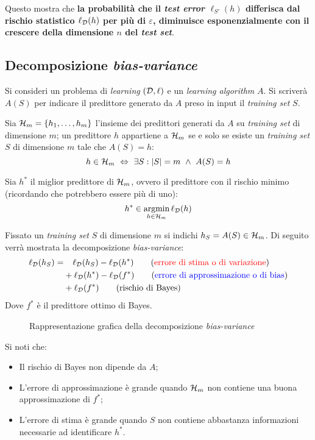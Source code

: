 Questo mostra che \textbf{la probabilità che il \textit{test error} 
$\ell_{S'}(h)$ differisca dal rischio statistico $\ell_{\mathcal{D}}(h)$ per più di 
$\varepsilon$, diminuisce esponenzialmente con il crescere della dimensione $n$ 
del \textit{test set}}.

\subsection{Decomposizione \textit{bias-variance}}
Si consideri un problema di \textit{learning} $(\mathcal{D},\ell)$ e un \textit{learning
algorithm} $A$. Si scriverà $A(S)$ per indicare il predittore generato da $A$
preso in input il \textit{training set} $S$.

Sia $\mathcal{H}_m = \{h_1,\dots,h_m\}$ l'insieme dei predittori generati da $A$ su 
\textit{training set} di dimensione $m$; un predittore $h$ appartiene a $\mathcal{H}_m$ se
e solo se esiste un \textit{training set} $S$ di dimensione $m$ tale che $A(S)=h$:
$$ h\in\mathcal{H}_m \ \Leftrightarrow \ \exists S : |S|=m \ \wedge \ A(S)=h $$

Sia $h^*$ il miglior predittore di $\mathcal{H}_m$, ovvero il predittore con il rischio minimo
(ricordando che potrebbero essere più di uno):
$$ h^* \in \operatorname*{argmin}_{h\in\mathcal{H}_m} \ell_{\mathcal{D}}(h) $$

Fissato un \textit{training set} $S$ di dimensione $m$ si indichi
$ h_S = A(S) \in \mathcal{H}_m $. Di seguito verrà mostrata la decomposizione
\textit{bias-variance}:
\begin{align}
    \ell_\D(h_S) =& \phantom{+.} \ell_\D(h_S) - \ell_\D(h^*)
    \tag{{\color{red}errore di stima o di variazione}}\\ 
        & +\ell_\D(h^*) - \ell_\D(f^*)
            \tag{{\color{blue}errore di approssimazione o di bias}}\\
        & +\ell_\D(f^*) \tag{rischio di Bayes}
\end{align}
Dove $f^*$ è il predittore ottimo di Bayes.
\begin{figure}[h]
    \centering
    
    \caption{Rappresentazione grafica della decomposizione \textit{bias-variance}}
\end{figure}

Si noti che:
\begin{itemize}
    \item Il rischio di Bayes non dipende da $A$;
    \item L'errore di approssimazione è grande quando $\mathcal{H}_m$ non contiene una buona
        approssimazione di $f^*$;
    \item L'errore di stima è grande quando $S$ non contiene abbastanza informazioni
        necessarie ad identificare $h^*$.
\end{itemize}

